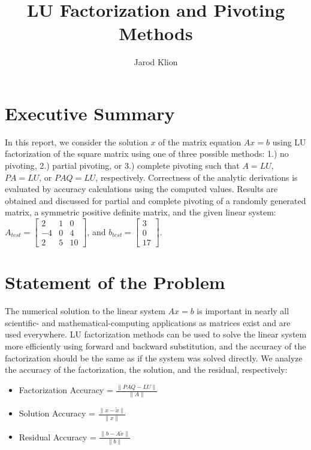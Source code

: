 \documentclass[11pt]{article}
\author{Jarod Klion}
\title{LU Factorization and Pivoting Methods}
\newcommand{\norm}[1]{\lVert#1\rVert}
\begin{document}
\maketitle

\section{Executive Summary}

In this report, we consider the solution $x$ of the matrix equation $Ax = b$ using LU factorization of the square matrix using one of three possible methods: 1.) no pivoting, 2.) partial pivoting, or 3.) complete pivoting such that $A = LU$, $PA = LU$, or $PAQ = LU$, respectively. Correctness of the analytic derivations is evaluated by accuracy calculations using the computed values. Results are obtained and discussed for partial and complete pivoting of a randomly generated matrix, a symmetric positive definite matrix, and the given linear system: $A_{test} = \begin{bmatrix} 2 & 1 & 0 \\ -4 & 0 & 4 \\ 2 & 5 & 10  \end{bmatrix}$, and $b_{test} = \begin{bmatrix} 3 \\ 0 \\ 17 \end{bmatrix}$.

\section{Statement of the Problem}

The numerical solution to the linear system $Ax = b$ is important in nearly all scientific- and mathematical-computing applications as matrices exist and are used everywhere. LU factorization methods can be used to solve the linear system more efficiently using forward and backward substitution, and the accuracy of the factorization should be the same as if the system was solved directly. We analyze the accuracy of the factorization, the solution, and the residual, respectively:
\begin{itemize}
	\item Factorization Accuracy = $\frac{\norm{PAQ - LU}}{\norm{A}}$
	\item Solution Accuracy = $\frac{\norm{x - \tilde{x}}}{\norm{x}}$
	\item Residual Accuracy = $\frac{\norm{b - A\tilde{x}}}{\norm{b}}$
\end{itemize} 
\end{document}
